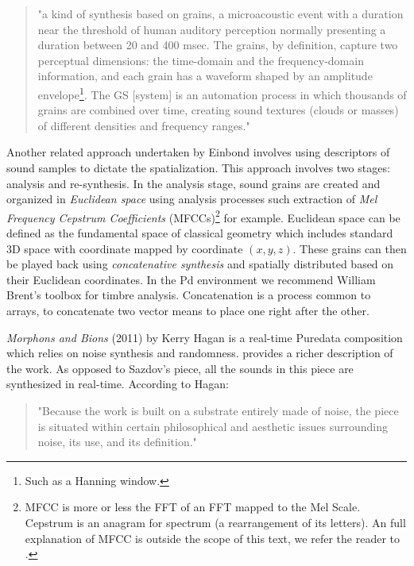 \begin{quote}
    "a kind of synthesis based on grains, a microacoustic event with a duration near the threshold of human auditory perception normally presenting a duration between 20 and 400 msec. The grains, by definition, capture two perceptual dimensions: the time-domain and the frequency-domain information, and each grain has a waveform shaped by an amplitude envelope\footnote{Such as a Hanning window.}. The GS [system] is an automation process in which thousands of grains are combined over time, creating sound textures (clouds or masses) of different densities and frequency ranges." \cite{roads2004microsound} 
\end{quote}

Another related approach undertaken by Einbond \cite{einbond2017mapping} involves using descriptors of sound samples to dictate the spatialization. This approach involves two stages: analysis and re-synthesis. In the analysis stage, sound grains are created and organized in \textit{Euclidean space} using analysis processes such extraction of \textit{Mel Frequency Cepstrum Coefficients} (MFCCs)\footnote{MFCC is more or less the FFT of an FFT mapped to the Mel Scale. Cepstrum is an anagram for spectrum (a rearrangement of its letters). An full explanation of MFCC is outside the scope of this text, we refer the reader to \cite{terasawa2005perceptual}.} for example. Euclidean space can be defined as the fundamental space of classical geometry which includes standard 3D space with coordinate mapped by coordinate $(x, y, z)$. These grains can then be played back using \textit{concatenative synthesis} and spatially distributed based on their Euclidean coordinates. In the Pd environment we recommend William Brent's \cite{brent2010timbre} toolbox for timbre analysis. Concatenation is a process common to arrays, to concatenate two vector means to place one right after the other.

\textit{Morphons and Bions} (2011) by Kerry Hagan is a real-time Puredata composition which relies on noise synthesis and randomness. \cite{hagan2012aesthetic} provides a richer description of the work. As opposed to Sazdov's piece, all the sounds in this piece are synthesized in real-time. According to Hagan: 

\begin{quote}
    "Because the work is built on a substrate entirely made of noise, the piece is situated within certain philosophical and aesthetic issues surrounding noise, its use, and its definition."
\end{quote}

